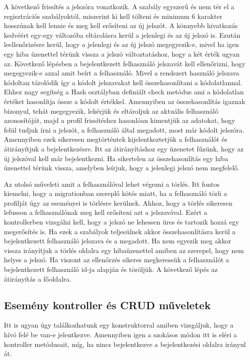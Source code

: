 \documentclass[
]{thesis-ekf}
\theoremstyle{definition}
\theoremstyle{remark}
\begin{document}
	A következő frissítés a jelszóra vonatkozik. A szabály egyszerű és nem tér el a regisztrációs szabályoktól, miszerint ki kell tölteni és minimum 6 karakter hosszúnak kell lennie és meg kell erősíteni az új jelszót. A könnyebb hivatkozás kedvéért egy-egy változóba eltárolásra kerül a jelenlegi és az új jelszó is. Ezután leellenőrizésre kerül, hogy a jelenlegi és az új jelszó megegyezik-e, mivel ha igen egy hiba üzenettel térünk vissza a jelszó változtatáshoz, hogy a két érték ugyan az. Következő lépésben a bejelentkezett felhasználó jelszavát kell ellenőrizni, hogy megegyezik-e azzal amit beírt a felhasználó. Mivel a rendszert használó jelszava kódoltan tárolódik így a kódolt jelszavakat kell összehasonlítani a kódolatlannal. Ehhez nagy segítség a Hash osztályban definiált check metódus ami a kódolatlan értéket hasonlítja össze a kódolt értékkel. Amennyiben az összehasonlítás igaznak bizonyul, tehát megegyezik, lekérjük és eltároljuk az aktuális felhasználó azonosítóját, majd a profil frissítéshez hasonlóan kimentjük az adatokat, hogy felül tudjuk írni a jelszót, a felhasználó által megadott, most már kódolt jelszóra. Amennyiben ezek sikeresen megtörténtek kijelentkeztetjük a felhasználót és átirányítjuk a bejelentkezésre. Itt az átirányításhoz egy üzenetet fűzünk, hogy az új jelszóval kell már bejelentkezni. Ha sikertelen az összehasonlítás egy hiba üzenettel térünk vissza, amelyben leírjuk, hogy a jelenlegi jelszó nem megfelelő. 
	
	Az utolsó műveleti amit a felhasználóval lehet végezni a törlés. Itt fontos kiemelni, hogy a migrationban szereplő kötés miatt, ha a felhasználó törli a profilját úgy az eseményei is törlésre kerülnek. Ahhoz, hogy a törlés sikeresen lefusson a felhasználónak meg kell erősíteni azt a jelszavával. Ezért a kontrollerben vizsgálni kell, hogy a jelszó ne lehessen üres és tartozik hozzá egy megerősítés is. Ha ezek a szabályok teljesülnek akkor összehasonlításra kerül a bejelentkezett felhasználó jelszava és a megadott. Ha nem egyezik meg akkor vissza irányítjuk a törlés oldalra egy hibaüzenettel amiben az szerepel, hogy nem helyes a jelszó. Ha viszont az ellenőrzés sikeres megkeressük a felhasználót a bejelentkezett felhasználó id-ja alapján és töröljük. A következő lépés az átirányítás a főoldalra.
	
	\subsection{Esemény kontroller és CRUD műveletek}
	Itt is ugyan úgy találkozhatunk egy konstruktorral amiben vizsgáljuk, hogy a hívó felé be van-e jelentkezve. Amennyiben igen a szokásos módon itt is eléri a kontroller metódusait, míg, ha nincs bejelentkezve a bejelentkezési oldalra irányul át.
	
\end{document}
